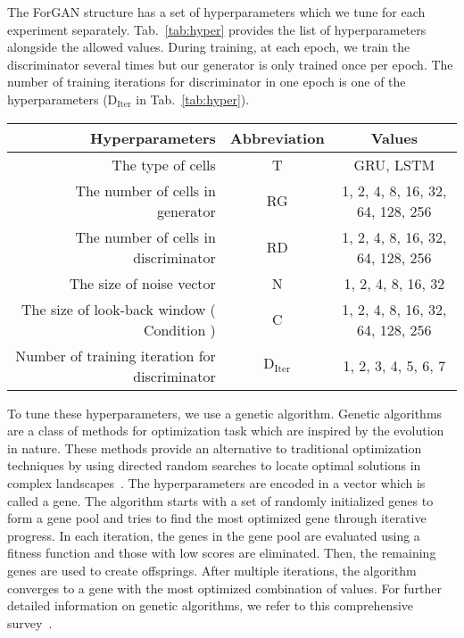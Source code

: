 \documentclass{ieeeaccess}
\begin{document}
The ForGAN structure has a set of hyperparameters which we tune for each experiment separately. Tab.~\ref{tab:hyper} provides the list of hyperparameters alongside the allowed values. During training, at each epoch, we train the discriminator several times but our generator is only trained once per epoch. The number of training iterations for discriminator in one epoch is one of the hyperparameters  ($\text{D}_\text{Iter}$ in Tab.~\ref{tab:hyper}).
\begin{table*}
	\centering
	\caption{The List of ForGAN hyperparameters alongside the range of allowed values.}
	\begin{tabular}{rcc}
		\toprule
		\textbf{Hyperparameters}                       & \textbf{Abbreviation}      &   \textbf{Values}\\
		\midrule
		The type of cells                          & T                       & GRU, LSTM\\
		The number of cells in generator           & RG                       & 1, 2, 4, 8, 16, 32, 64, 128, 256\\
		The number of cells in discriminator       & RD                      & 1, 2, 4, 8, 16, 32, 64, 128, 256\\
		The size of noise vector                       & N                      & 1, 2, 4, 8, 16, 32\\
		The size of look-back window ( Condition )     & C                     & 1, 2, 4, 8, 16, 32, 64, 128, 256\\
		Number of training iteration for discriminator & $\text{D}_\text{Iter}$ & 1, 2, 3, 4, 5, 6, 7\\
		\bottomrule
	\end{tabular}
	\label{tab:hyper}
\end{table*}
To tune these hyperparameters, we use a genetic algorithm. Genetic algorithms~\cite{holland1992adaptation} are a class of methods for optimization task which are inspired by the evolution in nature. These methods provide an alternative to traditional optimization techniques by using directed random searches to locate optimal solutions in complex landscapes~\cite{srinivas1994genetic}. The hyperparameters are encoded in a vector which is called a gene. The algorithm starts with a set of randomly initialized genes to form a gene pool and tries to find the most optimized gene through iterative progress. In each iteration, the genes in the gene pool are evaluated using a fitness function and those with low scores are eliminated. Then, the remaining genes are used to create offsprings. After multiple iterations, the algorithm converges to a gene with the most optimized combination of values. For further detailed information on genetic algorithms, we refer to this comprehensive survey~\cite{srinivas1994genetic}.
\end{document}
